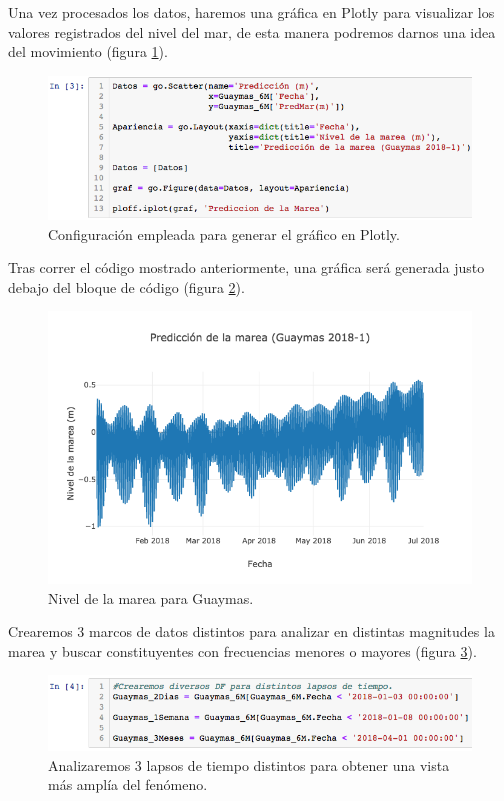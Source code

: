 \documentclass[12pt]{article}
\begin{document}
Una vez procesados los datos, haremos una gráfica en Plotly para visualizar los valores registrados del nivel del mar, de esta manera podremos darnos una idea del movimiento (figura \ref{fig:cod-nivel-mar}).

\begin{figure}[h!]
	\center
	\includegraphics[scale=.6]{./Images/cod-nivel-mar}
	\caption{\label{fig:cod-nivel-mar} Configuración empleada para generar el gráfico en Plotly.}
\end{figure}

Tras correr el código mostrado anteriormente, una gráfica será generada justo debajo del bloque de código (figura \ref{fig:graf-nivel-mar}).

\begin{figure}[h!]
	\center	
	\includegraphics[scale=.6]{./Images/graf-nivel-mar}
	\caption{\label{fig:graf-nivel-mar} Nivel de la marea para Guaymas.}
\end{figure}

Crearemos 3 marcos de datos distintos para analizar en distintas magnitudes la marea y buscar constituyentes con frecuencias menores o mayores (figura \ref{fig:nuevosdf}).

\begin{figure}[h!]
	\center
	\includegraphics[scale=.6]{./Images/nuevosdf}
	\caption{\label{fig:nuevosdf} Analizaremos 3 lapsos de tiempo distintos para obtener una vista más amplía del fenómeno.}
\end{figure}
\end{document}
